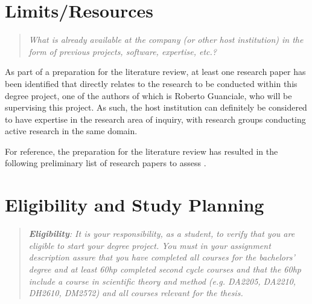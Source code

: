 \documentclass[12pt, a4paper]{article}
\begin{document}
\section{Limits/Resources}

\begin{quote}
	\textit{What is already available at the company (or other host institution) in the form of previous projects, software, expertise, etc.?}
\end{quote}

As part of a preparation for the literature review, at least one research paper \cite{sound_transpilation_from_binary_to_ir} has been identified that directly relates to the research to be conducted within this degree project, one of the authors of which is Roberto Guanciale, who will be supervising this project. As such, the host institution can definitely be considered to have expertise in the research area of inquiry, with research groups conducting active research in the same domain.

For reference, the preparation for the literature review has resulted in the following preliminary list of research papers to assess \cite{graph_based_ir,retargetable_binary_translator,dynamic_binary_translation,uqbt_binary_translator,retargetable_static_binary_translator,ssa_for_decompilation,valgrind,bitblaze,architecture_independent_binary_analysis_and_transformation,arm_analysis_using_llvm,bap,revgen,wartell_rewriting_x86_binaries,barf,singled_graph_disassembly,dbill,instruction_idiom_detection,graph_based_higher_order_ir,reconstruction_of_instruction_idioms,extracting_instruction_semantics_via_symbolic_exectuion_of_code_generators,software_transformation,state_of_the_art_of_war,function_recovery,bin2llvm,sound_transpilation_from_binary_to_ir,cast_study_llvm_suitable_for_binary_analysis,revng,evaluation_of_irs,binrec,lifter_synthesis,superset_disassembly,b2r2,llvm_ir_lifter_using_mcsema_and_dyninst,gtirb,case_for_bap_and_angr,retrowrite}.


\section{Eligibility and Study Planning}

\begin{quote}
	\textit{\textbf{Eligibility}: It is your responsibility, as a student, to verify that you are eligible to start your degree project. You must in your assignment description assure that you have completed all courses for the bachelors' degree and at least 60hp completed second cycle courses and that the 60hp include a course in scientific theory and method (e.g. DA2205, DA2210, DH2610, DM2572) and all courses relevant for the thesis.}
\end{quote}
\end{document}
